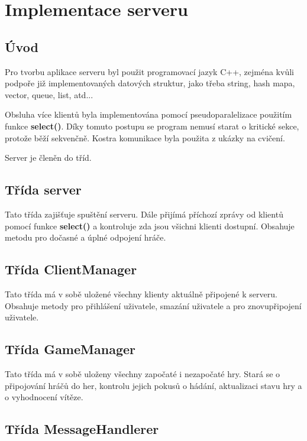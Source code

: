 \documentclass[12pt]{report}
\begin{document}
	\chapter{Implementace serveru}
	
	\section{Úvod}
	Pro tvorbu aplikace serveru byl použit programovací jazyk C++, zejména kvůli podpoře již implementovaných datových struktur, jako třeba string, hash mapa, vector, queue, list, atd...
	
	Obsluha více klientů byla implementována pomocí pseudoparalelizace použitím funkce \textbf{select()}. Díky tomuto postupu se program nemusí starat o kritické sekce, protože běží sekvenčně. Kostra komunikace byla použita z ukázky na cvičení.
	
	Server je členěn do tříd.
	
	\section{Třída server}
	
	Tato třída zajišťuje spuštění serveru. Dále přijímá příchozí zprávy od klientů pomocí funkce \textbf{select()} a kontroluje zda jsou všichni klienti dostupní. Obsahuje metodu pro dočasné a úplné odpojení hráče.
	
	\section{Třída ClientManager}
	
	Tato třída má v sobě uložené všechny klienty aktuálně připojené k serveru. Obsahuje metody pro přihlášení uživatele, smazání uživatele a pro znovupřipojení uživatele.
	
	\section{Třída GameManager}
	
	Tato třída má v sobě uloženy všechny započaté i nezapočaté hry. Stará se o připojování hráčů do her, kontrolu jejich pokusů o hádání, aktualizaci stavu hry a o vyhodnocení vítěze.
	
	\section{Třída MessageHandlerer}
	
\end{document}
